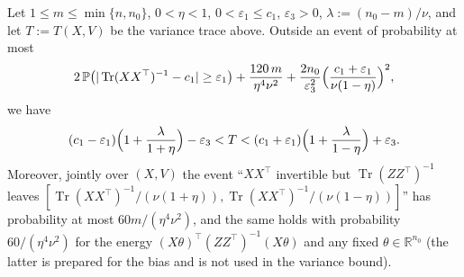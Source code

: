 \begin{theorem}\label{thm:dd:sampleSandwich}
  \leanok
Let $1\le m\le\min\{n,n_0\}$, $0<\eta<1$, $0<\varepsilon_1\le c_1$, $\varepsilon_3>0$, $\lambda:=(n_0-m)/\nu$, and let $T:=T(X,V)$ be the variance trace above. Outside an event of probability at most
\[
  2\,\mathbb P\bigl(|\operatorname{Tr}(XX^\top)^{-1}-c_1|\ge\varepsilon_1\bigr)+\frac{120\,m}{\eta^4\nu^2}+\frac{2n_0}{\varepsilon_3^2}\Bigl(\frac{c_1+\varepsilon_1}{\nu(1-\eta)}\Bigr)^2,
\]
we have
\[
  (c_1-\varepsilon_1)\Bigl(1+\frac{\lambda}{1+\eta}\Bigr)-\varepsilon_3<T<(c_1+\varepsilon_1)\Bigl(1+\frac{\lambda}{1-\eta}\Bigr)+\varepsilon_3 .
\]
Moreover, jointly over $(X,V)$ the event ``$XX^\top$ invertible but $\operatorname{Tr}(ZZ^\top)^{-1}$ leaves $[\operatorname{Tr}(XX^\top)^{-1}/(\nu(1+\eta)),\operatorname{Tr}(XX^\top)^{-1}/(\nu(1-\eta))]$'' has probability at most $60m/(\eta^4\nu^2)$, and the same holds with probability $60/(\eta^4\nu^2)$ for the energy $(X\theta)^\top(ZZ^\top)^{-1}(X\theta)$ and any fixed $\theta\in\mathbb R^{n_0}$ (the latter is prepared for the bias and is not used in the variance bound).
\end{theorem}

